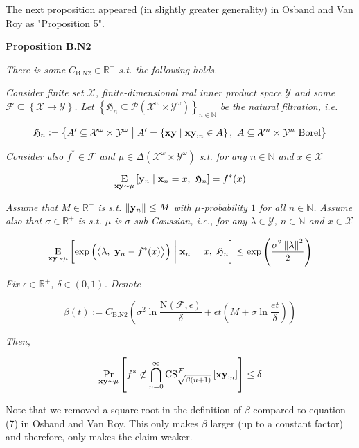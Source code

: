 \documentclass[a4paper]{article}
\newcommand{\Co}[1]{}
\newcommand{\AP}[1]{\left(#1\right)}
\newcommand{\AB}[1]{\left[#1\right]}
\newcommand{\AC}[1]{\left\{#1\right\}}
\newcommand{\ABM}[2]{\left[#1\;\middle\vert\;#2\right]}
\newcommand{\ACM}[2]{\left\{#1\;\middle\vert\;#2\right\}}
\newcommand{\Pa}[2]{\underset{#1}{\operatorname{Pr}}\AB{#2}}
\newcommand{\CE}[3]{\underset{#1}{\operatorname{E}}\ABM{#2}{#3}}
\newcommand{\PS}[1]{\mathcal{P}\AP{#1}}
\newcommand{\Nats}{\mathbb{N}}
\newcommand{\Reals}{\mathbb{R}}
\newcommand{\Norm}[1]{\left\Vert #1 \right\Vert}
\newcommand{\Chev}[1]{\left\langle #1 \right\rangle}
\newcommand{\X}{\mathcal{X}}
\newcommand{\Y}{\mathcal{Y}}
\newcommand{\F}{\mathcal{F}}
\newcommand{\N}{\mathrm{N}}
\newcommand{\CS}{\mathrm{CS}}
\begin{document}
The next proposition appeared (in slightly greater generality) in Osband and Van Roy as "Proposition 5".

\textbf{Proposition B.N2}\Co{b}

\textit{There is some $C_{\mathrm{B.N2}}\in\Reals^+$ s.t. the following holds.}\Co{i}

\textit{Consider finite set $\X$, finite-dimensional real inner product space $\Y$ and some $\F\subseteq\AC{\X\rightarrow\Y}$. Let $\AC{\mathfrak{H}_n\subseteq\PS{\X^\omega\times\Y^\omega}}_{n\in\Nats}$ be the natural filtration, i.e.}\Co{i}

$$\mathfrak{H}_n:=\ACM{A'\subseteq\X^\omega\times\Y^\omega}{A'=\ACM{\bold{xy}}{\bold{xy}_{:n}\in A},\ A\subseteq\X^n\times\Y^n\text{ Borel}}$$

\textit{Consider also $f^*\in\F$ and $\mu\in\Delta\AP{\X^\omega\times\Y^\omega}$ s.t. for any $n\in\Nats$ and $x\in\X$}\Co{i}

$$\CE{\bold{xy}\sim\mu}{\bold{y}_n}{\bold{x}_n=x,\ \mathfrak{H}_n} = f^*(x)$$

\textit{Assume that $M\in\Reals^+$ is s.t. $\Norm{\bold{y}_n}\leq M$ with $\mu$-probability $1$ for all $n\in\Nats$. Assume also that $\sigma\in\Reals^+$ is s.t. $\mu$ is $\sigma$-sub-Gaussian, i.e., for any $\lambda\in\Y$, $n\in\Nats$ and $x\in\X$}\Co{i}

$$\CE{\bold{xy}\sim\mu}{\exp\AP{\Chev{\lambda,\ \bold{y}_n-f^*(x)}}}{\bold{x}_n=x,\ \mathfrak{H}_n} \leq \exp\AP{\frac{\sigma^2\Norm{\lambda}^2}{2}}$$

\textit{Fix $\epsilon\in\Reals^+$, $\delta\in(0,1)$. Denote}\Co{i}

$$\beta(t):=C_{\mathrm{B.N2}}\AP{\sigma^2 \ln{\frac{\N(\F,\epsilon)}{\delta}}+\epsilon t\AP{M+\sigma\ln{\frac{et}{\delta}}}}$$

\textit{Then,}\Co{i}

$$\Pa{\bold{xy}\sim\mu}{f^*\not\in\bigcap_{n=0}^\infty\CS^\F_{\sqrt{\beta(n+1)}}\AB{\bold{xy}_{:n}}} \leq \delta$$

Note that we removed a square root in the definition of $\beta$ compared to equation (7) in Osband and Van Roy. This only makes $\beta$ larger (up to a constant factor) and therefore, only makes the claim weaker.
\end{document}
